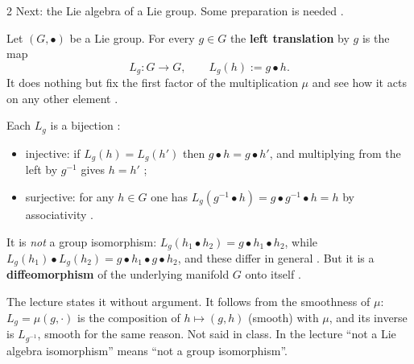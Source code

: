 \begin{paracol}{2}
Next: the Lie algebra of a Lie group. Some preparation is needed .
\begin{definition}\label{def:ll-left}
Let $(G,\bullet)$ be a Lie group. For every $g\in G$ the \textbf{left translation} by $g$ is the map
\[
  L_g\colon G\to G,\qquad L_g(h):=g\bullet h.
\]
It does nothing but fix the first factor of the multiplication $\mu$ and see how it acts on any other element   .
\end{definition}
Each $L_g$ is a bijection :
\begin{itemize}
  \item injective: if $L_g(h)=L_g(h')$ then $g\bullet h=g\bullet h'$, and multiplying from the left by $g^{-1}$ gives $h=h'$  ;
  \item surjective: for any $h\in G$ one has $L_g(g^{-1}\bullet h)=g\bullet g^{-1}\bullet h=h$ by associativity  .
\end{itemize}
It is \emph{not} a group isomorphism: $L_g(h_1\bullet h_2)=g\bullet h_1\bullet h_2$, while $L_g(h_1)\bullet L_g(h_2)=g\bullet h_1\bullet g\bullet h_2$, and these differ in general   . But it is a \textbf{diffeomorphism} of the underlying manifold $G$ onto itself .
\begin{coursenote}
The lecture states it without argument. It follows from the smoothness of $\mu$: $L_g=\mu(g,\cdot)$ is the composition of $h\mapsto(g,h)$ (smooth) with $\mu$, and its inverse is $L_{g^{-1}}$, smooth for the same reason. Not said in class. In the lecture ``not a Lie algebra isomorphism'' means ``not a group isomorphism''. 
\end{coursenote}


\end{paracol}

